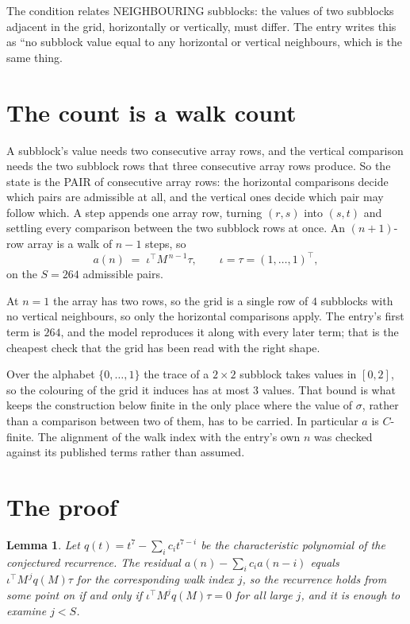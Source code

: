 \documentclass[11pt,a4paper]{article}
\theoremstyle{plain}
\newtheorem{lemma}[theorem]{Lemma}
\theoremstyle{definition}
\begin{document}
The condition relates NEIGHBOURING subblocks: the values of two subblocks adjacent in the grid,
horizontally or vertically, must differ. The entry writes this as ``no subblock value equal to any horizontal or vertical neighbours, which is the same thing.

\section{The count is a walk count}

A subblock's value needs two consecutive array rows, and the vertical
comparison needs the two subblock rows that three consecutive array rows produce. So the state
is the PAIR of consecutive array rows: the horizontal comparisons decide which pairs are
admissible at all, and the vertical ones decide which pair may follow which. A step appends one
array row, turning $(r,s)$ into $(s,t)$ and settling every comparison between the two subblock
rows at once. An $(n+1)$-row array is a walk of $n-1$ steps, so
\[
a(n)\;=\;\iota^{\!\top}M^{\,n-1}\tau,\qquad\iota=\tau=(1,\dots,1)^{\!\top},
\]
on the $S=264$ admissible pairs.

At $n=1$ the array has two rows, so the grid is a single row of $4$
subblocks with no vertical neighbours, so only the horizontal comparisons apply. The
entry's first term is $264$, and the model reproduces it along with every later term; that
is the cheapest check that the grid has been read with the right shape.

Over the alphabet $\{0,\dots,1\}$ the trace of a $2\times2$ subblock takes values in
$[0,2]$, so the colouring of the grid it induces has at most $3$ values.
That bound is what keeps the construction below finite in the only place where the value of
$\sigma$, rather than a comparison between two of them, has to be carried.
In particular $a$ is $C$-finite. The alignment of the walk index with the entry's own $n$ was
checked against its published terms rather than assumed.

\section{The proof}

\begin{lemma}\label{lem:crit}
Let $q(t)=t^{7}-\sum_i c_it^{7-i}$ be the characteristic polynomial of the
conjectured recurrence. The residual $a(n)-\sum_ic_ia(n-i)$ equals
$\iota^{\!\top}M^{\,j}q(M)\tau$ for the corresponding walk index $j$, so the recurrence
holds from some point on if and only if $\iota^{\!\top}M^{j}q(M)\tau=0$ for all large $j$,
and it is enough to examine $j<S$.
\end{lemma}
\end{document}

